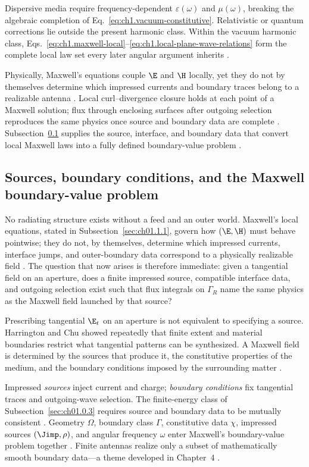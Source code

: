 Dispersive media require
frequency-dependent \(\varepsilon(\omega)\) and \(\mu(\omega)\), breaking the
algebraic completion of Eq.~\eqref{eq:ch1.vacuum-constitutive}. Relativistic or
quantum corrections lie outside the present harmonic class. Within the vacuum harmonic class,
Eqs.~\eqref{eq:ch1.maxwell-local}--\eqref{eq:ch1.local-plane-wave-relations}
form the complete local law set every later angular argument inherits
\cite{maxwell1873}.

Physically, Maxwell's equations couple $\E$ and $\H$ locally, yet they do not by themselves determine which impressed currents and boundary traces belong to a realizable antenna \cite{stratton1941}. Local curl--divergence closure holds at each point of a Maxwell solution; flux through enclosing surfaces after outgoing selection reproduces the same physics once source and boundary data are complete \cite{harrington2001}. Subsection~\ref{sec:ch01.1.2} supplies the source, interface, and boundary data that convert local Maxwell laws into a fully defined boundary-value problem \cite{stratton1941}.

\subsection{Sources, boundary conditions, and the Maxwell boundary-value problem}
\label{sec:ch01.1.2}

No radiating structure exists without a feed and an outer world. Maxwell's local equations, stated in Subsection~\ref{sec:ch01.1.1}, govern how $(\E,\H)$ must behave pointwise; they do not, by themselves, determine which impressed currents, interface jumps, and outer-boundary data correspond to a physically realizable field \cite{stratton1941}. The question that now arises is therefore immediate: given a tangential field on an aperture, does a finite impressed source, compatible interface data, and outgoing selection exist such that flux integrals on $\Gamma_R$ name the same physics as the Maxwell field launched by that source?

Prescribing tangential $\E_t$ on an aperture is not equivalent to specifying a source. Harrington \cite{harrington2001} and Chu \cite{chu1948} showed repeatedly that finite extent and material boundaries restrict what tangential patterns can be synthesized. A Maxwell field is determined by the sources that produce it, the constitutive properties of the medium, and the boundary conditions imposed by the surrounding matter \cite{maxwell1873}.

Impressed \emph{sources} inject current and charge; \emph{boundary conditions} fix tangential
traces and outgoing-wave selection. The finite-energy class of Subsection~\ref{sec:ch01.0.3} requires source and boundary data to be mutually consistent
\cite{stratton1941}.
Geometry $\Omega$, boundary class $\Gamma$, constitutive data $\chi$, impressed sources $(\Jimp,\rho)$, and angular frequency $\omega$ enter Maxwell's boundary-value problem together \cite{maxwell1873}.
Finite antennas realize only a subset of
mathematically smooth boundary data---a theme developed in Chapter~4 \cite{stratton1941}.

